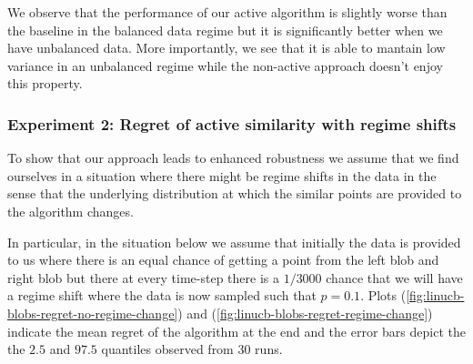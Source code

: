 \documentclass{article}
\begin{document}
We observe that the performance of our active algorithm is slightly worse than the baseline in the balanced data regime
but it is significantly better when we have unbalanced data. More importantly, we see that it is able to mantain low variance
in an unbalanced regime while the non-active approach doesn't enjoy this property.

\subsubsection{Experiment 2: Regret of active similarity with regime shifts}
To show that our approach leads to enhanced robustness we assume that we find ourselves in a situation
where there might be regime shifts in the data in the sense that the underlying distribution at which the similar points are provided
to the algorithm changes.

In particular, in the situation below we assume that initially the data is provided to us where there is an equal chance of getting a point
from the left blob and right blob but there at every time-step there is a $1/3000$ chance that
we will have a regime shift where the data is now sampled such that $p = 0.1$.
Plots (\ref{fig:linucb-blobs-regret-no-regime-change}) and (\ref{fig:linucb-blobs-regret-regime-change}) indicate the mean regret of the algorithm at the end
and the error bars depict the the $2.5$ and $97.5$ quantiles observed from 30 runs.
\end{document}
